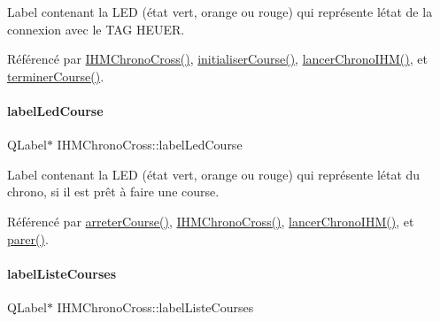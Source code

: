 Label contenant la L\+ED (état vert, orange ou rouge) qui représente l\textquotesingle{}état de la connexion avec le T\+AG H\+E\+U\+ER. 



Référencé par \hyperlink{class_i_h_m_chrono_cross_a479fc90733fba3e65fb06aa4a3adc02e}{I\+H\+M\+Chrono\+Cross()}, \hyperlink{class_i_h_m_chrono_cross_adde019cc3799befac3fd9555e392eab9}{initialiser\+Course()}, \hyperlink{class_i_h_m_chrono_cross_a0e78f2d4d5e46c4551fc4517614a56d8}{lancer\+Chrono\+I\+H\+M()}, et \hyperlink{class_i_h_m_chrono_cross_ac89c6ec3040e8b787f1fbdb670405023}{terminer\+Course()}.

\mbox{\label{class_i_h_m_chrono_cross_a8568c80f2e2ffe96c81d2a94a2146159}} 
\paragraph{\texorpdfstring{label\+Led\+Course}{labelLedCourse}}
{\footnotesize\ttfamily Q\+Label$\ast$ I\+H\+M\+Chrono\+Cross\+::label\+Led\+Course\hspace{0.3cm}{\ttfamily [private]}}



Label contenant la L\+ED (état vert, orange ou rouge) qui représente l\textquotesingle{}état du chrono, si il est prêt à faire une course. 



Référencé par \hyperlink{class_i_h_m_chrono_cross_ad3d8f287d08dd9aa0c6b10c9973672a4}{arreter\+Course()}, \hyperlink{class_i_h_m_chrono_cross_a479fc90733fba3e65fb06aa4a3adc02e}{I\+H\+M\+Chrono\+Cross()}, \hyperlink{class_i_h_m_chrono_cross_a0e78f2d4d5e46c4551fc4517614a56d8}{lancer\+Chrono\+I\+H\+M()}, et \hyperlink{class_i_h_m_chrono_cross_aa272ffa273fc8c487ea64ef6a43b4439}{parer()}.

\mbox{\label{class_i_h_m_chrono_cross_a2b563f2574ad86acaecc01f0357f85be}} 
\paragraph{\texorpdfstring{label\+Liste\+Courses}{labelListeCourses}}
{\footnotesize\ttfamily Q\+Label$\ast$ I\+H\+M\+Chrono\+Cross\+::label\+Liste\+Courses\hspace{0.3cm}{\ttfamily [private]}}



